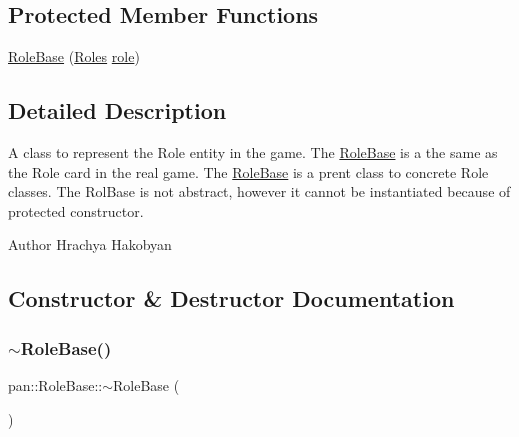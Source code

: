 \subsection*{Protected Member Functions}
\begin{DoxyCompactItemize}
\item 
\hyperlink{classpan_1_1_role_base_af5df3999e33323806909b0d6d190cecc}{Role\+Base} (\hyperlink{namespacepan_a5017f84fa51152eae453759537d1ced6}{Roles} \hyperlink{classpan_1_1_role_base_a1da6d8a75410162b2fc40f05a0b594c9}{role})
\end{DoxyCompactItemize}


\subsection{Detailed Description}
A class to represent the Role entity in the game. The \hyperlink{classpan_1_1_role_base}{Role\+Base} is a the same as the Role card in the real game. The \hyperlink{classpan_1_1_role_base}{Role\+Base} is a prent class to concrete Role classes. The Rol\+Base is not abstract, however it cannot be instantiated because of protected constructor. 

\begin{DoxyAuthor}{Author}
Hrachya Hakobyan 
\end{DoxyAuthor}


\subsection{Constructor \& Destructor Documentation}
\mbox{\label{classpan_1_1_role_base_a6573ddc4f609c21035b7d0e383a01ba8}} 
\subsubsection{\texorpdfstring{$\sim$\+Role\+Base()}{~RoleBase()}}
{\footnotesize\ttfamily pan\+::\+Role\+Base\+::$\sim$\+Role\+Base (\begin{DoxyParamCaption}{ }\end{DoxyParamCaption})\hspace{0.3cm}{\ttfamily [virtual]}}

\mbox{\label{classpan_1_1_role_base_af5df3999e33323806909b0d6d190cecc}} 
